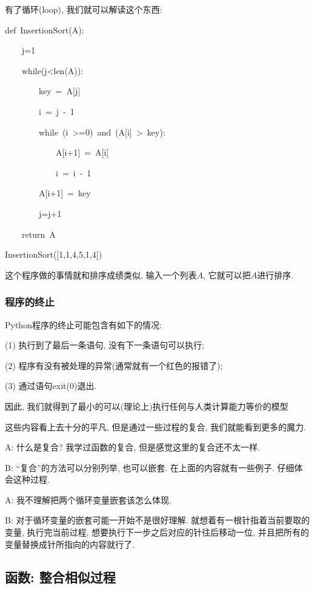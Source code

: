 有了循环(loop), 我们就可以解读这个东西:
\begin{lyxcode}
def~InsertionSort(A):

~~~~j=1

~~~~while(j<len(A)):

~~~~~~~~key~=~A{[}j{]}

~~~~~~~~i~=~j~-~1

~~~~~~~~while~(i~>=0)~and~(A{[}i{]}~>~key):

~~~~~~~~~~~~A{[}i+1{]}~=~A{[}i{]}

~~~~~~~~~~~~i~=~i~-~1

~~~~~~~~A{[}i+1{]}~=~key

~~~~~~~~j=j+1

~~~~return~A

InsertionSort({[}1,1,4,5,1,4{]})
\end{lyxcode}
这个程序做的事情就和排序成绩类似. 输入一个列表$A$, 它就可以把$A$进行排序.  


\subsubsection{程序的终止}
\begin{definition}
Python程序的终止可能包含有如下的情况:

(1) 执行到了最后一条语句, 没有下一条语句可以执行;

(2) 程序有没有被处理的异常(通常就有一个红色的报错了);

(3) 通过语句exit(0)退出. 
\end{definition}
因此, 我们就得到了最小的可以(理论上)执行任何与人类计算能力等价的模型

这些内容看上去十分的平凡, 但是通过一些过程的复合, 我们就能看到更多的魔力. 

\begin{dialogue}
	A: 什么是复合? 我学过函数的复合, 但是感觉这里的复合还不太一样. 
	
	B: ``复合''的方法可以分别列举, 也可以嵌套. 在上面的内容就有一些例子. 仔细体会这种过程. 
	
	A: 我不理解把两个循环变量嵌套该怎么体现. 
	
	B: 对于循环变量的嵌套可能一开始不是很好理解. 就想着有一根针指着当前要取的变量, 执行完当前过程, 想要执行下一步之后对应的针往后移动一位, 并且把所有的变量替换成针所指向的内容就行了.   
\end{dialogue}

\subsection{函数: 整合相似过程}

